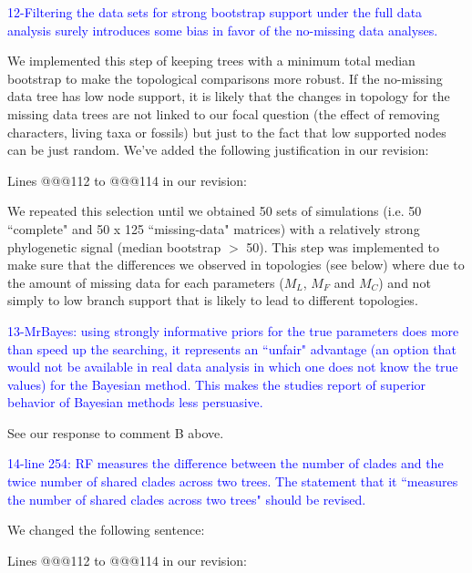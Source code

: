 \documentclass[11pt]{letter}
\begin{document}
\begin{letter}{}

\textcolor{blue}{12-Filtering the data sets for strong bootstrap support under the full data analysis surely introduces some bias in favor of the no-missing data analyses.}

We implemented this step of keeping trees with a minimum total median bootstrap to make the topological comparisons more robust. If the no-missing data tree has low node support, it is likely that the changes in topology for the missing data trees are not linked to our focal question (the effect of removing characters, living taxa or fossils) but just to the fact that low supported nodes can be just random. We've added the following justification in our revision:


Lines @@@112 to @@@114 in our revision:

\hfill\begin{minipage}{\dimexpr\textwidth-1cm}
We repeated this selection until we obtained 50 sets of simulations (i.e. 50 ``complete" and 50 x 125 ``missing-data" matrices) with a relatively strong phylogenetic signal (median bootstrap $>$ 50). This step was implemented to make sure that the differences we observed in topologies (see below) where due to the amount of missing data for each parameters ($M_L$, $M_F$ and $M_C$) and not simply to low branch support that is likely to lead to different topologies.
\end{minipage}


\textcolor{blue}{13-MrBayes: using strongly informative priors for the true parameters does more than speed up the searching, it represents an ``unfair" advantage (an option that would not be available in real data analysis in which one does not know the true values) for the Bayesian method. This makes the studies report of superior behavior of Bayesian methods less persuasive.}

See our response to comment B above.


\textcolor{blue}{14-line 254: RF measures the difference between the number of clades and the twice number of shared clades across two trees. The statement that it ``measures the number of shared clades across two trees" should be revised.}

We changed the following sentence: %

Lines @@@112 to @@@114 in our revision:


\end{letter}
\end{document}
